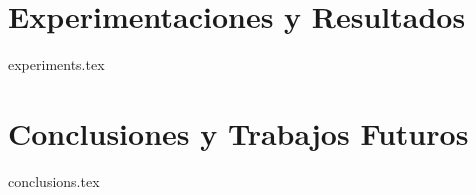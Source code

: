 \documentclass{report}
\begin{document}
\chapter{Experimentaciones y Resultados}
{experiments.tex}

\chapter{Conclusiones y Trabajos Futuros}
{conclusions.tex}







%



\end{document}
